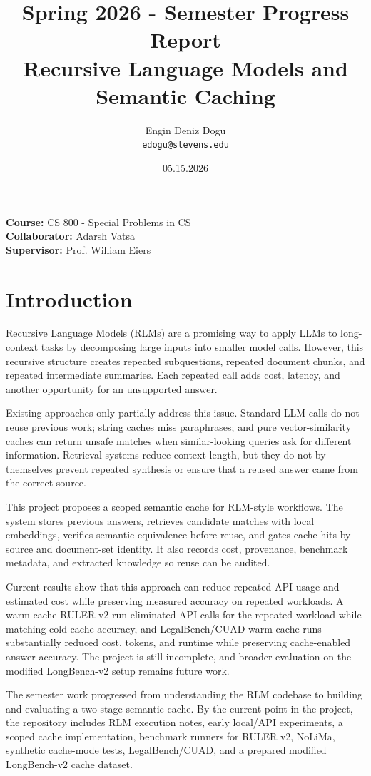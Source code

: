 \documentclass[10pt,a4paper]{article}
\title{\bfseries Spring 2026 - Semester Progress Report\\Recursive Language Models and Semantic Caching}
\author{Engin Deniz Dogu \\ \texttt{edogu@stevens.edu}}
\date{05.15.2026}
\begin{document}
\maketitle

\textbf{Course:} CS 800 - Special Problems in CS\\
\textbf{Collaborator: }Adarsh Vatsa\\
\textbf{Supervisor: }Prof. William Eiers

\section{Introduction}

Recursive Language Models (RLMs) are a promising way to apply LLMs to long-context tasks by decomposing large inputs into smaller model calls. However, this recursive structure creates repeated subquestions, repeated document chunks, and repeated intermediate summaries. Each repeated call adds cost, latency, and another opportunity for an unsupported answer.

Existing approaches only partially address this issue. Standard LLM calls do not reuse previous work; string caches miss paraphrases; and pure vector-similarity caches can return unsafe matches when similar-looking queries ask for different information. Retrieval systems reduce context length, but they do not by themselves prevent repeated synthesis or ensure that a reused answer came from the correct source.

This project proposes a scoped semantic cache for RLM-style workflows. The system stores previous answers, retrieves candidate matches with local embeddings, verifies semantic equivalence before reuse, and gates cache hits by source and document-set identity. It also records cost, provenance, benchmark metadata, and extracted knowledge so reuse can be audited.

Current results show that this approach can reduce repeated API usage and estimated cost while preserving measured accuracy on repeated workloads. A warm-cache RULER v2 run eliminated API calls for the repeated workload while matching cold-cache accuracy, and LegalBench/CUAD warm-cache runs substantially reduced cost, tokens, and runtime while preserving cache-enabled answer accuracy. The project is still incomplete, and broader evaluation on the modified LongBench-v2 setup remains future work.

The semester work progressed from understanding the RLM codebase to building and evaluating a two-stage semantic cache. By the current point in the project, the repository includes RLM execution notes, early local/API experiments, a scoped cache implementation, benchmark runners for RULER v2, NoLiMa, synthetic cache-mode tests, LegalBench/CUAD, and a prepared modified LongBench-v2 cache dataset.
\end{document}
